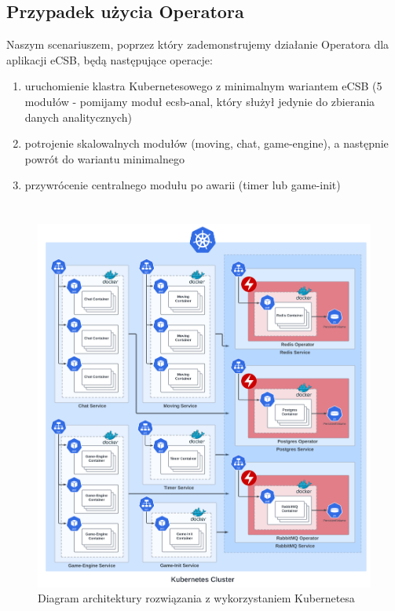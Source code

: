 \documentclass[polish]{aghengthesis}
\begin{document}
\section{Przypadek użycia Operatora}

Naszym scenariuszem, poprzez który zademonstrujemy działanie Operatora dla aplikacji eCSB, będą następujące operacje:

\begin{enumerate}\label{scenario}
    \item uruchomienie klastra Kubernetesowego z minimalnym wariantem eCSB (5 modułów - pomijamy moduł ecsb-anal, który służył jedynie do zbierania danych analitycznych)
    \item potrojenie skalowalnych modułów (moving, chat, game-engine), a następnie powrót do wariantu minimalnego
    \item przywrócenie centralnego modułu po awarii (timer lub game-init)
\end{enumerate}


\chapter{\ChapterTitleSolutionArchitecture}
\label{sec:architektura}

\begin{figure}[!htbp]
    \centering
    \includegraphics[width=0.9\linewidth]{resources/architecture_diagram.png}
    \caption{Diagram architektury rozwiązania z wykorzystaniem Kubernetesa}
    \label{fig:architecture}
\end{figure}
\end{document}
